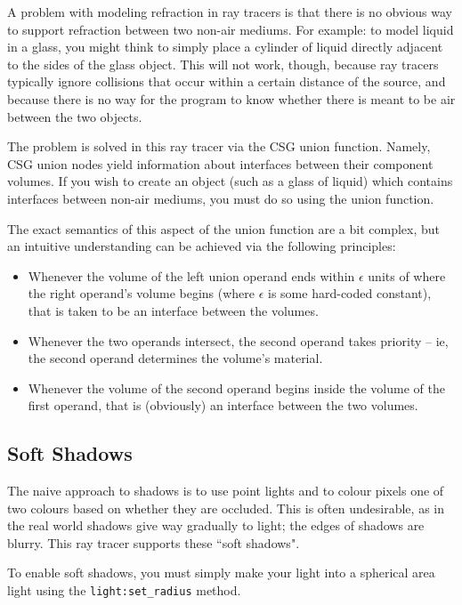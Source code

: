 \documentclass{article}
\begin{document}
A problem with modeling refraction in ray tracers is that there is no obvious
way to support refraction between two non-air mediums. For example: to model
liquid in a glass, you might think to simply place a cylinder of liquid directly
adjacent to the sides of the glass object. This will not work, though, because
ray tracers typically ignore collisions that occur within a certain distance of
the source, and because there is no way for the program to know whether there is
meant to be air between the two objects.

The problem is solved in this ray tracer via the CSG union function. Namely, CSG
union nodes yield information about interfaces between their component volumes.
If you wish to create an object (such as a glass of liquid) which contains
interfaces between non-air mediums, you must do so using the union function.

The exact semantics of this aspect of the union function are a bit complex, but
an intuitive understanding can be achieved via the following principles:

\begin{itemize}
  \item Whenever the volume of the left union operand ends within $\epsilon$
    units of where the right operand's volume begins (where $\epsilon$ is some
    hard-coded constant), that is taken to be an interface between the volumes.
  \item Whenever the two operands intersect, the second operand takes priority
    -- ie, the second operand determines the volume's material.
  \item Whenever the volume of the second operand begins inside the volume of
    the first operand, that is (obviously) an interface between the two volumes.
\end{itemize}

\subsection{Soft Shadows}
\label{soft_shadows}

The naive approach to shadows is to use point lights and to colour pixels one of
two colours based on whether they are occluded. This is often undesirable, as in
the real world shadows give way gradually to light; the edges of shadows are
blurry. This ray tracer supports these ``soft shadows".

To enable soft shadows, you must simply make your light into a spherical area
light using the {\tt light:set\_radius} method.
\end{document}

